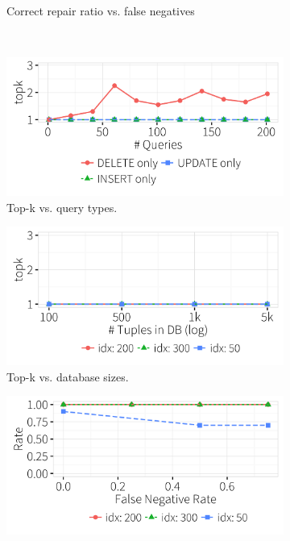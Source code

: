 \begin{figure}[ht]
\begin{subfigure} [t]{.3\textwidth}
    \vspace*{-.25in}
    \caption{Correct repair ratio vs. false negatives}
    \label{f:fnratio} 
    \end{subfigure} \\
    \begin{subfigure} [t]{.3\textwidth}
    \includegraphics[width = .99\columnwidth]{figures/indelup_fixcount}
    \vspace*{-.25in}
    \caption{Top-k vs. query types. }
    \vspace*{-.1in}
    \label{f:querytypefixcount} 
    \end{subfigure}
    \begin{subfigure} [t]{.3\textwidth}
    \includegraphics[width = .99\columnwidth]{figures/dbsize_fixcount}
    \vspace*{-.25in}
    \caption{Top-k vs. database sizes. }
    \vspace*{-.1in}
    \label{f:dbsizecount} 
    \end{subfigure}
    \begin{subfigure} [t]{.3\textwidth}
    \includegraphics[width = .99\columnwidth]{figures/noise_fn_acc_idx}

\end{subfigure}
\end{figure}

